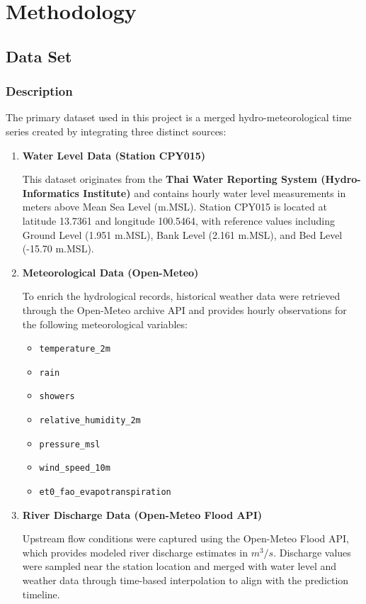 \setlength{\footskip}{8mm}

\chapter{Methodology}
\label{ch:methodology}

\section{Data Set}

\subsection{Description}
The primary dataset used in this project is a merged hydro-meteorological time series created by integrating three distinct sources:

\begin{enumerate}
    \item \textbf{Water Level Data (Station CPY015)}

    This dataset\cite{hiiwaterlevel} originates from the \textbf{Thai Water Reporting System (Hydro-Informatics Institute)} and contains hourly water level measurements in meters above Mean Sea Level (m.MSL). Station CPY015 is located at latitude 13.7361 and longitude 100.5464, with reference values including Ground Level (1.951 m.MSL), Bank Level (2.161 m.MSL), and Bed Level (-15.70 m.MSL).

    \item \textbf{Meteorological Data (Open-Meteo)}

    To enrich the hydrological records, historical weather data were retrieved through the Open-Meteo archive API\cite{openmeteo} and provides hourly observations for the following meteorological variables:
    \begin{itemize}
        \item \texttt{temperature\_2m}
        \item \texttt{rain}
        \item \texttt{showers}
        \item \texttt{relative\_humidity\_2m}
        \item \texttt{pressure\_msl}
        \item \texttt{wind\_speed\_10m}
        \item \texttt{et0\_fao\_evapotranspiration}
    \end{itemize}

    \item \textbf{River Discharge Data (Open-Meteo Flood API)}

    Upstream flow conditions were captured using the Open-Meteo Flood API, which provides modeled river discharge estimates in $m^3/s$. Discharge values were sampled near the station location and merged with water level and weather data through time-based interpolation to align with the prediction timeline.
\end{enumerate}

